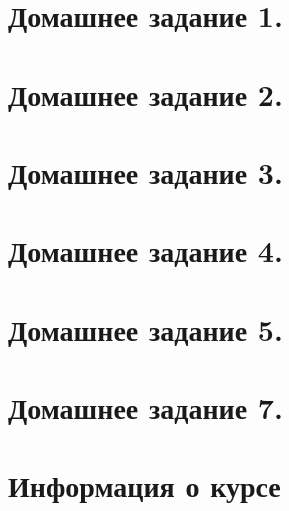 \newpage

\section{Домашнее задание 1.}

\newpage
\section{Домашнее задание 2.}

\newpage
\section{Домашнее задание 3.}

\newpage
\section{Домашнее задание 4.}

\newpage
\section{Домашнее задание 5.}


\newpage
\section{Домашнее задание 7.}


\newpage
\section{Информация о курсе}

